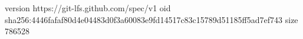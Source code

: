 version https://git-lfs.github.com/spec/v1
oid sha256:4446fafaf80d4e04483d0f3a60083e9fd14517c83c15789d51185ff5ad7ef743
size 786528
